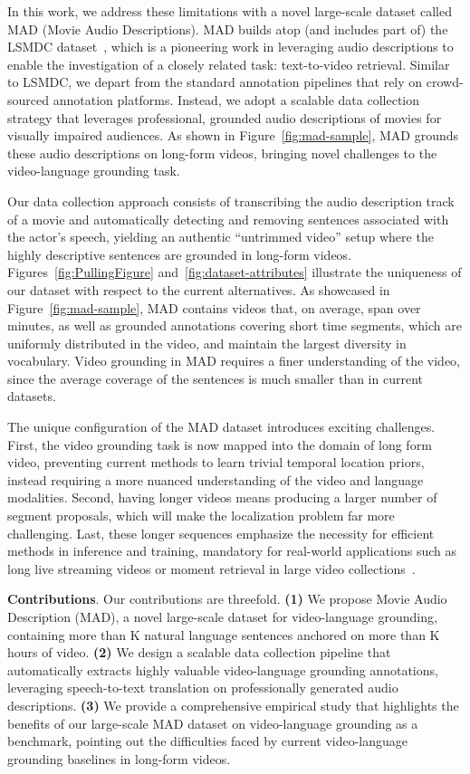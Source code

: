 \documentclass[10pt,twocolumn,letterpaper]{article}
\renewcommand{\paragraph}[1]{\vspace{1mm}\noindent\textbf{#1}.}
\begin{document}
In this work, we address these limitations with a novel large-scale dataset called MAD (Movie Audio Descriptions). MAD builds atop (and includes part of) the LSMDC dataset~\cite{rohrbach2017movie}, which is a pioneering work in leveraging audio descriptions to enable the investigation of a closely related task: text-to-video retrieval. 
Similar to LSMDC, we depart from the standard annotation pipelines that rely on crowd-sourced annotation platforms. Instead, we adopt a scalable data collection strategy that leverages professional, grounded audio descriptions of movies for visually impaired audiences. As shown in Figure~\ref{fig:mad-sample}, MAD grounds these audio descriptions on long-form videos, bringing novel challenges to the video-language grounding task.

Our data collection approach consists of transcribing the audio description track of a movie and automatically detecting and removing sentences associated with the actor's speech, yielding an authentic ``untrimmed video'' setup where the highly descriptive sentences are grounded in long-form videos.
Figures~\ref{fig:PullingFigure} and~\ref{fig:dataset-attributes} illustrate the uniqueness of our dataset with respect to the current alternatives.  
As showcased in Figure~\ref{fig:mad-sample}, MAD contains videos that, on average, span over  minutes, as well as grounded annotations covering short time segments, which are uniformly distributed in the video, and maintain the largest diversity in vocabulary.
Video grounding in MAD requires a finer understanding of the video, since the average coverage of the sentences is much smaller than in current datasets. 

The unique configuration of the MAD dataset introduces exciting challenges. 
First, the video grounding task is now mapped into the domain of long form video, preventing current methods to learn trivial temporal location priors, instead requiring a more nuanced understanding of the video and language modalities.
Second, having longer videos means producing a larger number of segment proposals, which will make the localization problem far more challenging. 
Last, these longer sequences emphasize the necessity for efficient methods in inference and training, mandatory for real-world applications such as long live streaming videos or moment retrieval in large video collections~\cite{escorcia2019temporal}. 

\paragraph{Contributions} Our contributions are threefold.
\textbf{(1)} We propose Movie Audio Description (MAD), a novel large-scale dataset for video-language grounding, containing more than K natural language sentences anchored on more than K hours of video. 
\textbf{(2)} We design a scalable data collection pipeline that automatically extracts highly valuable video-language grounding annotations, leveraging speech-to-text translation on professionally generated audio descriptions.
\textbf{(3)} We provide a comprehensive empirical study that highlights the benefits of our large-scale MAD dataset on video-language grounding as a benchmark, pointing out the difficulties faced by current video-language grounding baselines in long-form videos. 
\end{document}
